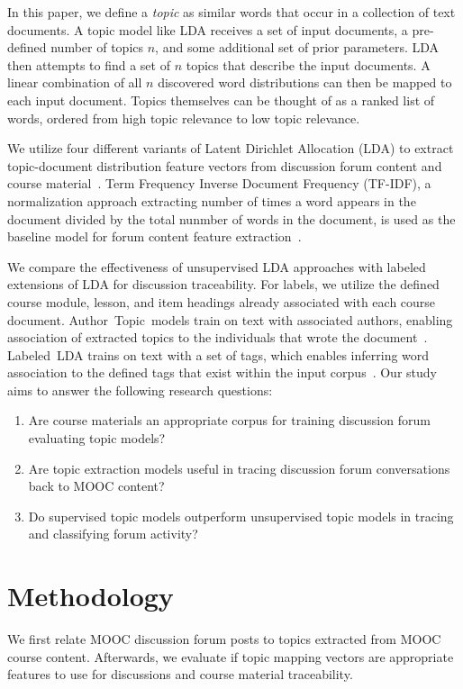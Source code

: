 \documentclass[sigconf, nonacm=true]{acmart}
\begin{document}
In this paper, we define a \textit{topic} as similar words that occur in a collection of text documents.
A topic model like LDA receives a set of input documents, a pre-defined number of topics $n$, and some additional set of prior parameters.
LDA then attempts to find a set of $n$ topics that describe the input documents.
A linear combination of all $n$ discovered word distributions can then be mapped to each input document.
Topics themselves can be thought of as a ranked list of words, ordered from high topic relevance to low topic relevance.

We utilize four different variants of Latent Dirichlet Allocation (LDA) to extract topic-document distribution feature vectors from discussion forum content and course material~\cite{blei2003latent}.
Term Frequency Inverse Document Frequency (TF-IDF), a normalization approach extracting number of times a word appears in the document divided by the total nunmber of words in the document, is used as the baseline model for forum content feature extraction~\cite{SALTON1988513}.

We compare the effectiveness of unsupervised LDA approaches with labeled extensions of LDA for discussion traceability.
For labels, we utilize the defined course module, lesson, and item headings already associated with each course document.
Author~Topic~models train on text with associated authors, enabling association of extracted topics to the individuals that wrote the document~\cite{rosen2004author}.
Labeled~LDA trains on text with a set of tags, which enables inferring word association to the defined tags that exist within the input corpus~\cite{ramage2009labeled}.
Our study aims to answer the following research questions:

\begin{enumerate}[label=\textbf{RQ\arabic*:}]
    \item Are course materials an appropriate corpus for training discussion forum evaluating topic models? %
    \item Are topic extraction models useful in tracing discussion forum conversations back to MOOC content? %
    \item Do supervised topic models outperform unsupervised topic models in tracing and classifying forum activity? %
\end{enumerate}


\section{Methodology}
We first relate MOOC discussion forum posts to topics extracted from MOOC course content.
Afterwards, we evaluate if topic mapping vectors are appropriate features to use for discussions and course material traceability.
\end{document}
